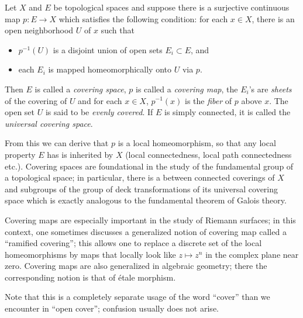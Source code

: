 \documentclass[12pt]{article}
\begin{document}
Let $X$ and $E$ be topological spaces and suppose there is a surjective continuous map 
$p\colon E \rightarrow X$ which satisfies the following condition: for each $x \in X$, there is an open neighborhood $U$ of $x$ such that 
\begin{itemize}
\item $p^{-1}(U)$ is a disjoint union of open sets $E_{i} \subset E$, and 
\item each $E_{i}$ is mapped homeomorphically onto $U$ via $p$. 
\end{itemize}
Then $E$ is called a \emph{covering space}, $p$ is called a \emph{covering map}, the $E_{i}$'s are \emph{sheets} of the covering of $U$ and for each $x \in X$, $p^{-1}(x)$ is the \emph{fiber} of $p$ above $x$. The open set $U$ is said to be \emph{evenly covered}.
If $E$ is simply connected, it is called the \emph{universal covering space}.

From this we can derive that $p$ is a local homeomorphism, so that any local property $E$ 
has is inherited by $X$ (local connectedness, local path connectedness etc.). Covering spaces
are foundational in the study of the fundamental group of a topological space; in particular, there is a  between connected coverings of $X$ and subgroups of the group of deck transformations of its universal covering space which is exactly analogous to the fundamental theorem of Galois theory.

Covering maps are especially important in the study of Riemann surfaces; in this context, one sometimes discusses a generalized notion of covering map called a ``ramified covering''; this allows one to replace a discrete set of the local homeomorphisms by maps that locally look like $z\mapsto z^n$ in the complex plane near zero. Covering maps are also generalized in algebraic geometry; there the corresponding notion is that of \'etale morphism.


Note that this is a completely separate usage of the word ``cover'' than we encounter in ``open cover''; confusion usually does not arise.
\end{document}

